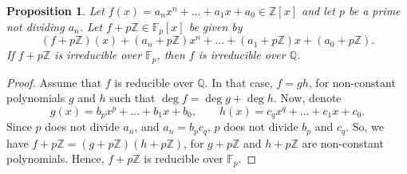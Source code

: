 \documentclass[a4paper, openany]{memoir}
\theoremstyle{definition}
\theoremstyle{plain}
\newtheorem{proposition}[definition]{Proposition}
\begin{document}
    \begin{proposition}
        Let $f(x) = a_n x^n + \dots + a_1 x + a_0 \in \mathbb{Z}[x]$ and let $p$ be a prime not dividing $a_n$. Let $f + p\mathbb{Z} \in \mathbb{F}_p[x]$ be given by
        \[(f + p\mathbb{Z})(x) + (a_n + p\mathbb{Z}) x^n + \dots + (a_1 + p\mathbb{Z}) x + (a_0 + p \mathbb{Z}).\]
        If $f + p\mathbb{Z}$ is irreducible over $\mathbb{F}_p$, then $f$ is irreducible over $\mathbb{Q}$.
    \end{proposition}
    \begin{proof}
        Assume that $f$ is reducible over $\mathbb{Q}$. In that case, $f = gh$, for non-constant polynomials $g$ and $h$ such that $\deg f = \deg g + \deg h$. Now, denote
        \[g(x) = b_p x^p + \dots + b_1 x + b_0, \qquad h(x) = c_q x^q + \dots + c_1 x + c_0.\]
        Since $p$ does not divide $a_n$, and $a_n = b_p c_q$, $p$ does not divide $b_p$ and $c_q$. So, we have $f + p\mathbb{Z} = (g + p\mathbb{Z})(h + p\mathbb{Z})$, for $g + p\mathbb{Z}$ and $h + p\mathbb{Z}$ are non-constant polynomials. Hence, $f + p\mathbb{Z}$ is reducible over $\mathbb{F}_p$.
    \end{proof}
\end{document}
